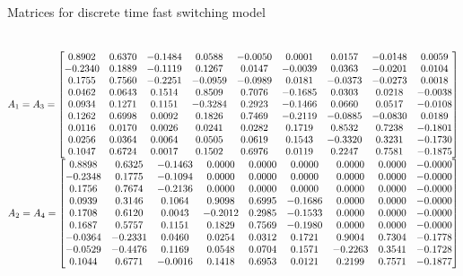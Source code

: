 \begin{table}
\caption{Matrices for discrete time fast switching model}~\label{matrices:fast}
{\scriptsize
$A_1=A_3=\left[\begin{matrix} 0.8902 &   0.6370&   -0.1484&    0.0588&   -0.0050&    0.0001&    0.0157&   -0.0148&    0.0059\\
   -0.2340&    0.1889&   -0.1119&    0.1267&    0.0147&   -0.0039&    0.0363&   -0.0201&    0.0104\\
    0.1755&    0.7560&   -0.2251&   -0.0959&   -0.0989&    0.0181&   -0.0373&   -0.0273&    0.0018\\
    0.0462&    0.0643&    0.1514&    0.8509&    0.7076&   -0.1685&    0.0303&    0.0218&   -0.0038\\
    0.0934&    0.1271&    0.1151&   -0.3284&    0.2923&   -0.1466&    0.0660&    0.0517&   -0.0108\\
    0.1262&    0.6998&    0.0092&    0.1826&    0.7469&   -0.2119&   -0.0885&   -0.0830&    0.0189\\
    0.0116&    0.0170&    0.0026&    0.0241&    0.0282&    0.1719&    0.8532&    0.7238&   -0.1801\\
    0.0256&    0.0364&    0.0064&    0.0505&    0.0619&    0.1543&   -0.3320&    0.3231&   -0.1730\\
    0.1047&    0.6724&    0.0017&    0.1502&    0.6976&    0.0119&    0.2247&    0.7581&   -0.1875\end{matrix}\right]$
$A_2=A_4=\left[\begin{matrix}0.8898 &   0.6325&   -0.1463&    0.0000&    0.0000&    0.0000&    0.0000&    0.0000&   -0.0000\\
   -0.2348&    0.1775&   -0.1094&    0.0000&    0.0000&    0.0000&    0.0000&    0.0000&   -0.0000\\
    0.1756&    0.7674&   -0.2136&    0.0000&    0.0000&    0.0000&    0.0000&    0.0000&   -0.0000\\
    0.0939&    0.3146&    0.1064&    0.9098&    0.6995&   -0.1686&    0.0000&    0.0000&   -0.0000\\
    0.1708&    0.6120&    0.0043&   -0.2012&    0.2985&   -0.1533&    0.0000&    0.0000&   -0.0000\\
    0.1687&    0.5757&    0.1151&    0.1829&    0.7569&   -0.1980&    0.0000&    0.0000&   -0.0000\\
   -0.0364&   -0.2331&    0.0460&    0.0254&    0.0312&    0.1721&    0.9004&    0.7304&   -0.1778\\
   -0.0529&   -0.4476&    0.1169&    0.0548&    0.0704&    0.1571&   -0.2263&    0.3541&   -0.1728\\
    0.1044&    0.6771&   -0.0016&    0.1418&    0.6953&    0.0121&    0.2199&    0.7571&   -0.1877\end{matrix}\right]$    
}
\end{table}
